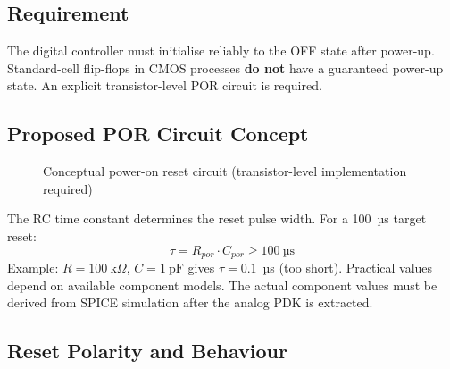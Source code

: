 \documentclass[11pt,a4paper]{article}
\begin{document}
\subsection{Requirement}

The digital controller must initialise reliably to the OFF state after power-up.
Standard-cell flip-flops in CMOS processes \textbf{do not} have a guaranteed power-up state.
An explicit transistor-level POR circuit is required.

\subsection{Proposed POR Circuit Concept}

\begin{figure}[H]
  \centering
  \caption{Conceptual power-on reset circuit (transistor-level implementation required)}
\end{figure}

The RC time constant determines the reset pulse width. For a 100~µs target reset:
\[
  \tau = R_{por} \cdot C_{por} \geq 100~\text{µs}
\]
Example: $R = 100~\text{k}\Omega$, $C = 1~\text{pF}$ gives $\tau = 0.1$~µs (too short).
Practical values depend on available component models. The actual component values must be
derived from SPICE simulation after the analog PDK is extracted.

\subsection{Reset Polarity and Behaviour}
\end{document}
